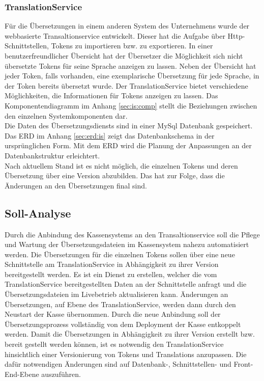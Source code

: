 \documentclass[10pt, oneside, ngerman]{article}
\begin{document}
  \subsubsection{TranslationService}\label{sec:analyse:current:ts}
    Für die Übersetzungen in einem anderen System des Unternehmens wurde der webbasierte Transaltionservice entwickelt. 
    Dieser hat die Aufgabe über Http-Schnittstellen, Tokens zu importieren bzw. zu exportieren.
    In einer benutzerfreundlicher Übersicht hat der Übersetzer die Möglichkeit sich nicht übersetzte Tokens für seine Sprache anzeigen zu lassen.
    Neben der Übersicht hat jeder Token, falls vorhanden, eine exemplarische Übersetzung für jede Sprache, in der Token bereits übersetzt wurde.
    Der TranslationService bietet verschiedene Möglichkeiten, die Informationen für Tokens anzeigen zu lassen. 
    Das Komponentendiagramm im Anhang \ref{sec:is:comp} stellt die Beziehungen zwischen den einzelnen Systemkomponenten dar.\\
    Die Daten des Übersetzungsdiensts sind in einer MySql Datenbank gespeichert. Das ERD im Anhang \ref{sec:erd:is} zeigt das Datenbankschema in der ursprünglichen Form. 
    Mit dem ERD wird die Planung der Anpassungen an der Datenbankstruktur erleichtert.\\
    Nach aktuellem Stand ist es nicht möglich, die einzelnen Tokens und deren Übersetzung über eine Version abzubilden. 
    Das hat zur Folge, dass die Änderungen an den Übersetzungen final sind.
  
  \subsection{Soll-Analyse}
    Durch die Anbindung des Kassensystems an den Transaltionservice soll die Pflege und Wartung der Übersetzungsdateien im Kassensystem nahezu automatisiert werden. 
    Die Übersetzungen für die einzelnen Tokens sollen über eine neue Schnittstelle am TranslationService in Abhängigkeit zu ihrer Version bereitgestellt werden. 
    Es ist ein Dienst zu erstellen, welcher die vom TranslationService bereitgestellten Daten an der Schnittstelle anfragt und die Übersetzungsdateien im Livebetrieb aktualisieren kann. 
    Änderungen an Übersetzungen, auf Ebene des TranslationService, werden dann durch den Neustart der Kasse übernommen. Durch die neue Anbindung soll der Übersetzungsprozess vollständig von dem Deployment der Kasse entkoppelt werden.
    Damit die Übersetzungen in Abhängigkeit zu ihrer Version erstellt bzw. bereit gestellt werden können, ist es notwendig den TranslationService hinsichtlich einer Versionierung von Tokens und Translations anzupassen. 
    Die dafür notwendigen Änderungen sind auf Datenbank-, Schnittstellen- und Front-End-Ebene auszuführen.
\end{document}
